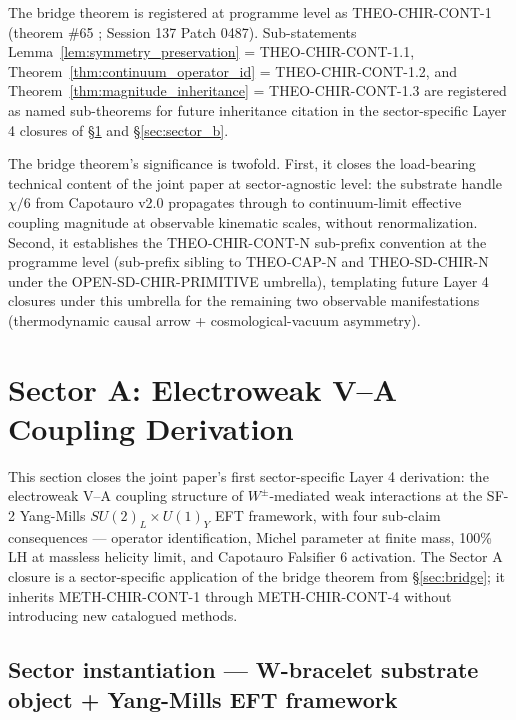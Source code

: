 \documentclass[11pt,letterpaper]{article}
\begin{document}
The bridge theorem is registered at programme level as THEO-CHIR-CONT-1 (theorem \#65 \cite{ResearchFrontier}; Session 137 Patch 0487). Sub-statements Lemma~\ref{lem:symmetry_preservation} = THEO-CHIR-CONT-1.1, Theorem~\ref{thm:continuum_operator_id} = THEO-CHIR-CONT-1.2, and Theorem~\ref{thm:magnitude_inheritance} = THEO-CHIR-CONT-1.3 are registered as named sub-theorems for future inheritance citation in the sector-specific Layer 4 closures of §\ref{sec:sector_a} and §\ref{sec:sector_b}.

The bridge theorem's significance is twofold. First, it closes the load-bearing technical content of the joint paper at sector-agnostic level: the substrate handle $\chi/6$ from Capotauro v2.0 propagates through to continuum-limit effective coupling magnitude at observable kinematic scales, without renormalization. Second, it establishes the THEO-CHIR-CONT-N sub-prefix convention at the programme level (sub-prefix sibling to THEO-CAP-N and THEO-SD-CHIR-N under the OPEN-SD-CHIR-PRIMITIVE umbrella), templating future Layer 4 closures under this umbrella for the remaining two observable manifestations (thermodynamic causal arrow + cosmological-vacuum asymmetry).

\section{Sector A: Electroweak V--A Coupling Derivation}
\label{sec:sector_a}

This section closes the joint paper's first sector-specific Layer 4 derivation: the electroweak V--A coupling structure of $W^\pm$-mediated weak interactions at the SF-2 Yang-Mills $SU(2)_L \times U(1)_Y$ EFT framework, with four sub-claim consequences --- operator identification, Michel parameter at finite mass, 100\% LH at massless helicity limit, and Capotauro Falsifier 6 activation. The Sector A closure is a sector-specific application of the bridge theorem from §\ref{sec:bridge}; it inherits METH-CHIR-CONT-1 through METH-CHIR-CONT-4 without introducing new catalogued methods.

\subsection{Sector instantiation — W-bracelet substrate object + Yang-Mills EFT framework}
\label{sec:sector_a_instantiation}
\end{document}
